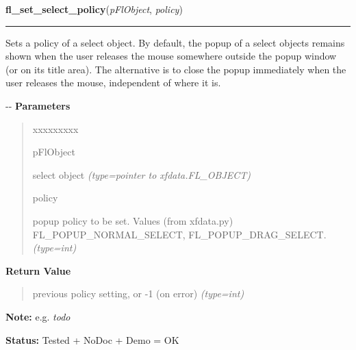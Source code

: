     \label{xformslib:flselect:fl_set_select_policy}

    \vspace{0.5ex}

\hspace{.8\funcindent}\begin{boxedminipage}{\funcwidth}

    \raggedright \textbf{fl\_set\_select\_policy}(\textit{pFlObject}, \textit{policy})

    \vspace{-1.5ex}

    \rule{\textwidth}{0.5\fboxrule}
\setlength{\parskip}{2ex}

Sets a policy of a select object. By default, the popup of a select
objects remains shown when the user releases the mouse somewhere outside
the popup window (or on its title area). The alternative is to close the
popup immediately when the user releases the mouse, independent of where
it is.

-{}-
\setlength{\parskip}{1ex}
      \textbf{Parameters}
      \vspace{-1ex}

      \begin{quote}
        \begin{Ventry}{xxxxxxxxx}

          \item[pFlObject]


select object
            {\it (type=pointer to xfdata.FL\_OBJECT)}

          \item[policy]


popup policy to be set. Values (from xfdata.py) FL\_POPUP\_NORMAL\_SELECT,
FL\_POPUP\_DRAG\_SELECT.
            {\it (type=int)}

        \end{Ventry}

      \end{quote}

      \textbf{Return Value}
    \vspace{-1ex}

      \begin{quote}

previous policy setting, or -1 (on error)
      {\it (type=int)}

      \end{quote}

\textbf{Note:} 
e.g. \emph{todo}


\textbf{Status:} 
Tested + NoDoc + Demo = OK


    \end{boxedminipage}


